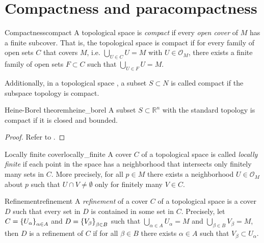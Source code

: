 \section{Compactness and paracompactness}

\begin{definition}{Compactness}{compact}
    A topological space  is \emph{compact} if every \emph{open cover} of \(M\) has a finite subcover. That is, the topological space is compact if for every family of open sets \(C\) that covers \(M\), i.e. \(\bigcup_{U \in C}U = M\) with \(U \in \mathcal{O}_M\), there exists a finite family of open sets \(F \subset C\) such that \(\bigcup_{U\in F} U = M\).

    Additionally, in a topological space , a subset \(S\subset N\) is called compact if the subspace topology is compact.
\end{definition}

\begin{theorem}{Heine-Borel theorem}{heine_borel}
    A subset \(S\subset\mathbb{R}^n\) with the standard topology is compact if it is closed and bounded.
\end{theorem}
\begin{proof}
    Refer to \cite{babyrudin}.
\end{proof}

\begin{definition}{Locally finite cover}{locally_finite}
    A cover \(C\) of a topological space  is called \emph{locally finite} if each point in the space has a neighborhood that intersects only finitely many sets in \(C\). More precisely, for all \(p \in M\) there exists a neighborhood \(U \in \mathcal{O}_M\) about \(p\) such that \(U \cap V \neq \emptyset\) only for finitely many \(V \in C\).
\end{definition}

\begin{definition}{Refinement}{refinement}
    A \emph{refinement} of a cover \(C\) of a topological space  is a cover \(D\) such that every set in \(D\) is contained in some set in \(C\). Precisely, let \(C = \left\{U_\alpha\right\}_{\alpha \in A}\) and \(D = \left\{V_\beta\right\}_{\beta \in B}\) such that \(\bigcup_{\alpha \in A} U_\alpha = M\) and \(\bigcup_{\beta \in B} V_\beta = M\), then \(D\) is a refinement of \(C\) if for all \(\beta \in B\) there exists \(\alpha \in A\) such that \(V_\beta \subset U_\alpha\).
\end{definition}


